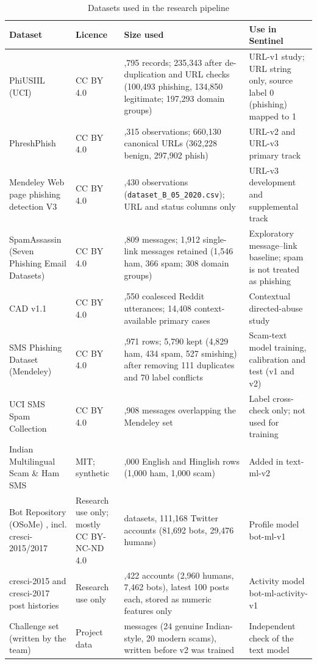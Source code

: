 \begin{table}[!htbp]
\centering
\small
\renewcommand{\arraystretch}{1.2}
\caption{Datasets used in the research pipeline}
\label{tab:datasets}
\begin{tabular}{|>{\raggedright\arraybackslash}p{2.7cm}|>{\raggedright\arraybackslash}p{1.9cm}|>{\raggedright\arraybackslash}p{5.1cm}|>{\raggedright\arraybackslash}p{4.2cm}|}
\hline
\textbf{Dataset} & \textbf{Licence} & \textbf{Size used} & \textbf{Use in Sentinel} \\ \hline
PhiUSIIL (UCI) \cite{phiusiil} & CC BY 4.0 & 235,795 records; 235,343 after de-duplication and URL checks (100,493 phishing, 134,850 legitimate; 197,293 domain groups) & URL-v1 study; URL string only, source label 0 (phishing) mapped to 1 \\ \hline
PhreshPhish \cite{phreshphish} & CC BY 4.0 & 666,315 observations; 660,130 canonical URLs (362,228 benign, 297,902 phish) & URL-v2 and URL-v3 primary track \\ \hline
Mendeley Web page phishing detection V3 \cite{mendeley} & CC BY 4.0 & 11,430 observations (\texttt{dataset\_B\_05\_2020.csv}); URL and status columns only & URL-v3 development and supplemental track \\ \hline
SpamAssassin (Seven Phishing Email Datasets) \cite{champa} & CC BY 4.0 & 5,809 messages; 1,912 single-link messages retained (1,546 ham, 366 spam; 308 domain groups) & Exploratory message--link baseline; spam is not treated as phishing \\ \hline
CAD v1.1 \cite{cad} & CC BY 4.0 & 26,550 coalesced Reddit utterances; 14,408 context-available primary cases & Contextual directed-abuse study \\ \hline
SMS Phishing Dataset (Mendeley) \cite{smsdata} & CC BY 4.0 & 5,971 rows; 5,790 kept (4,829 ham, 434 spam, 527 smishing) after removing 111 duplicates and 70 label conflicts & Scam-text model training, calibration and test (v1 and v2) \\ \hline
UCI SMS Spam Collection \cite{ucisms} & CC BY 4.0 & 4,908 messages overlapping the Mendeley set & Label cross-check only; not used for training \\ \hline
Indian Multilingual Scam \& Ham SMS \cite{india14} & MIT; synthetic & 2,000 English and Hinglish rows (1,000 ham, 1,000 scam) & Added in text-ml-v2 \\ \hline
Bot Repository (OSoMe) \cite{botrepo}, incl. cresci-2015/2017 \cite{cresci2015,cresci2017} & Research use only; mostly CC BY-NC-ND 4.0 & 13 datasets, 111,168 Twitter accounts (81,692 bots, 29,476 humans) & Profile model bot-ml-v1 \\ \hline
cresci-2015 and cresci-2017 post histories \cite{cresci2015,cresci2017} & Research use only & 10,422 accounts (2,960 humans, 7,462 bots), latest 100 posts each, stored as numeric features only & Activity model bot-ml-activity-v1 \\ \hline
Challenge set (written by the team) & Project data & 44 messages (24 genuine Indian-style, 20 modern scams), written before v2 was trained & Independent check of the text model \\ \hline
\end{tabular}
\end{table}

